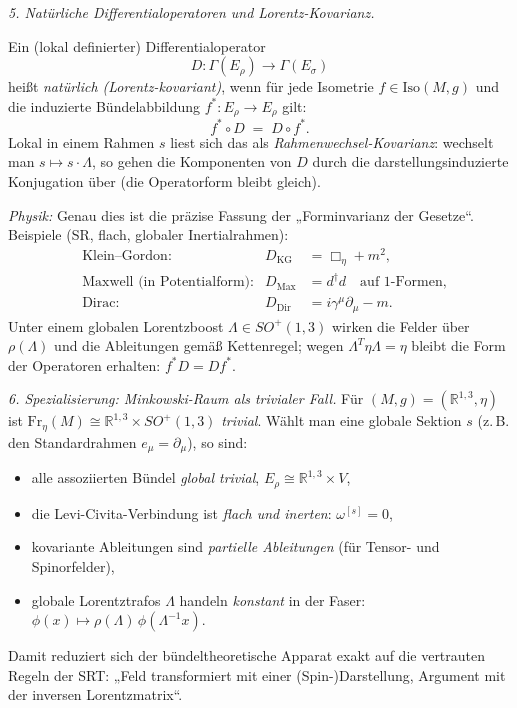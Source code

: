 \documentclass[10pt, letterpaper]{article}
\newcommand{\R}{\mathbb{R}}
\newcommand{\Iso}{\mathrm{Iso}}
\begin{document}
\bigskip
\emph{5. Natürliche Differentialoperatoren und Lorentz-Kovarianz.}

Ein (lokal definierter) Differentialoperator
\[
D:\Gamma(E_\rho)\longrightarrow \Gamma(E_\sigma)
\]
heißt \emph{natürlich (Lorentz-kovariant)}, wenn für jede Isometrie
$f\in\Iso(M,g)$ und die induzierte Bündelabbildung $f^*:E_\rho\to E_\rho$ gilt:
\[
f^*\circ D \;=\; D\circ f^*.
\]
Lokal in einem Rahmen $s$ liest sich das als \emph{Rahmenwechsel-Kovarianz}:
wechselt man $s\mapsto s\cdot\Lambda$, so gehen die Komponenten von $D$ durch die
darstellungsinduzierte Konjugation über (die Operatorform bleibt gleich).

\smallskip
\emph{Physik:} Genau dies ist die präzise Fassung der „Forminvarianz der Gesetze“.
Beispiele (SR, flach, globaler Inertialrahmen):
\[
\begin{aligned}
&\text{Klein–Gordon:}& D_{\text{KG}} &= \Box_\eta + m^2,\\[2pt]
&\text{Maxwell (in Potentialform):}& D_{\text{Max}} &= d^\dagger d \quad \text{auf 1-Formen},\\[2pt]
&\text{Dirac:}& D_{\text{Dir}} &= i\gamma^\mu\partial_\mu - m.
\end{aligned}
\]
Unter einem globalen Lorentzboost $\Lambda\in SO^+(1,3)$ wirken die Felder über $\rho(\Lambda)$
und die Ableitungen gemäß Kettenregel; wegen $\Lambda^T\eta\Lambda=\eta$ bleibt die Form der
Operatoren erhalten: $f^*D = D f^*$.

\bigskip
\emph{6. Spezialisierung: Minkowski-Raum als trivialer Fall.}
Für $(M,g)=(\R^{1,3},\eta)$ ist $\mathrm{Fr}_\eta(M)\cong \R^{1,3}\times SO^+(1,3)$ \emph{trivial}.
Wählt man eine globale Sektion $s$ (z.\,B. den Standardrahmen $e_\mu=\partial_\mu$),
so sind:
\begin{itemize}
\item alle assoziierten Bündel \emph{global trivial}, $E_\rho\cong \R^{1,3}\times V$,
\item die Levi-Civita-Verbindung ist \emph{flach und inerten}: $\omega^{[s]}=0$,
\item kovariante Ableitungen sind \emph{partielle Ableitungen} (für Tensor- und Spinorfelder),
\item globale Lorentztrafos $\Lambda$ handeln \emph{konstant} in der Faser: 
$\phi(x)\mapsto \rho(\Lambda)\,\phi(\Lambda^{-1}x)$.
\end{itemize}
Damit reduziert sich der bündeltheoretische Apparat exakt auf die vertrauten
Regeln der SRT: „Feld transformiert mit einer (Spin-)Darstellung, Argument mit
der inversen Lorentzmatrix“.
\end{document}
